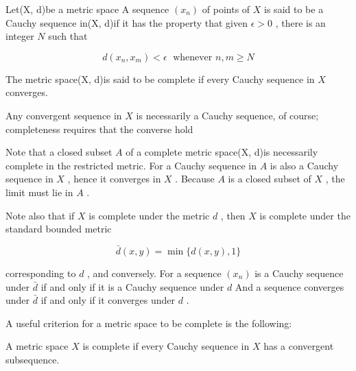 \begin{definition} Let(X, d)be a metric space A sequence \(\left( {x}_{n}\right)\) of points of \(X\) is said to be a Cauchy sequence in(X, d)if it has the property that given \(\epsilon  > 0\) , there is an integer \(N\) such that

\[
d\left( {{x}_{n},{x}_{m}}\right)  < \epsilon \;\text{ whenever }n,m \geq  N
\]

The metric space(X, d)is said to be complete if every Cauchy sequence in \(X\) converges.
\end{definition}

Any convergent sequence in \(X\) is necessarily a Cauchy sequence, of course; completeness requires that the converse hold

Note that a closed subset \(A\) of a complete metric space(X, d)is necessarily complete in the restricted metric. For a Cauchy sequence in \(A\) is also a Cauchy sequence in \(X\) , hence it converges in \(X\) . Because \(A\) is a closed subset of \(X\) , the limit must lie in \(A\) .

Note also that if \(X\) is complete under the metric \(d\) , then \(X\) is complete under the standard bounded metric

\[
\bar{d}\left( {x,y}\right)  = \min \{ d\left( {x,y}\right) ,1\}
\]

corresponding to \(d\) , and conversely. For a sequence \(\left( {x}_{n}\right)\) is a Cauchy sequence under \(\bar{d}\) if and only if it is a Cauchy sequence under \(d\) And a sequence converges under \(\bar{d}\) if and only if it converges under \(d\) .

A useful criterion for a metric space to be complete is the following:

\begin{lemma} A metric space \(X\) is complete if every Cauchy sequence in \(X\) has a convergent subsequence.
\end{lemma}

